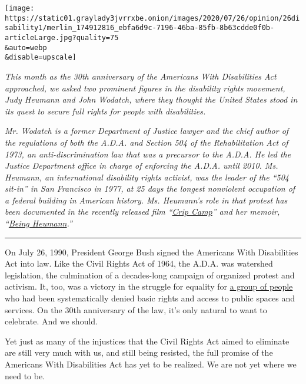 \texttt{[image: https://static01.graylady3jvrrxbe.onion/images/2020/07/26/opinion/26disability1/merlin\_174912816\_ebfa6d9c-7196-46ba-85fb-8b63cdde0f0b-articleLarge.jpg?quality=75\\\&auto=webp\\\&disable=upscale]}

\emph{This month as the 30th anniversary of the Americans With
Disabilities Act approached, we asked two prominent figures in the
disability rights movement, Judy Heumann and John Wodatch, where they
thought the United States stood in its quest to secure full rights for
people with disabilities.}

\emph{Mr. Wodatch is a former Department of Justice lawyer and the chief
author of the regulations of both the A.D.A. and Section 504 of the
Rehabilitation Act of 1973, an anti-discrimination law that was a
precursor to the A.D.A. He led the Justice Department office in charge
of enforcing the A.D.A. until 2010. Ms. Heumann, an international
disability rights activist, was the leader of the ``504 sit-in'' in San
Francisco in 1977, at 25 days the longest nonviolent occupation of a
federal building in American history. Ms. Heumann's role in that protest
has been documented in the recently released film
``}\href{https://www.nytimes3xbfgragh.onion/2020/03/24/movies/crip-camp-review.html}{\emph{Crip
Camp}}\emph{'' and her memoir,
``}\href{https://www.penguinrandomhouse.com/books/621090/being-heumann-by-judith-heumann/}{\emph{Being
Heumann}}\emph{.''}

\begin{center}\rule{0.5\linewidth}{\linethickness}\end{center}

On July 26, 1990, President George Bush signed the Americans With
Disabilities Act into law. Like the Civil Rights Act of 1964, the A.D.A.
was watershed legislation, the culmination of a decades-long campaign of
organized protest and activism. It, too, was a victory in the struggle
for equality for
\href{https://www.nytimes3xbfgragh.onion/2020/07/20/us/judy-heumann-alice-wong-haben-girma-disability-activists.html}{a
group of people} who had been systematically denied basic rights and
access to public spaces and services. On the 30th anniversary of the
law, it's only natural to want to celebrate. And we should.

Yet just as many of the injustices that the Civil Rights Act aimed to
eliminate are still very much with us, and still being resisted, the
full promise of the Americans With Disabilities Act has yet to be
realized. We are not yet where we need to be.

